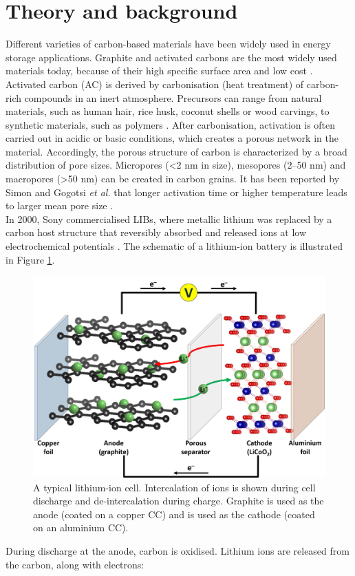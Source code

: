 \section{Theory and background}
Different varieties of carbon-based materials have been widely used in energy storage applications. Graphite and activated carbons are the most widely used materials today, because of their high specific surface area and low cost \cite{wang_review_2012}. Activated carbon (AC) is derived by carbonisation (heat treatment) of carbon-rich compounds in an inert atmosphere. Precursors can range from natural materials, such as human hair, rice husk, coconut shells or wood carvings, to synthetic materials, such as polymers \cite{hulicovajurcakova_combined_2009,si_tunable_2013,yalcin_studies_2000,barton_tailored_1999}. After carbonisation, activation is often carried out in acidic or basic conditions, which creates a porous network in the material. Accordingly, the porous structure of carbon is characterized by a broad distribution of pore sizes. Micropores (<2 nm in size), mesopores (2–50 nm) and macropores (>50 nm) can be created in carbon grains. It has been reported by Simon and Gogotsi \textit{et al.} that longer activation time or higher temperature leads to larger mean pore size \cite{simon_materials_2008}.\\
In 2000, Sony commercialised LIBs, where metallic lithium was replaced by a carbon host structure that reversibly absorbed and released  ions at low electrochemical potentials \cite{ozawa_lithium-ion_1994}. The schematic of a lithium-ion battery is illustrated in Figure \ref{Figures/chap5fig:LIB}.
\begin{figure}[h]
\centering
\includegraphics[width=\textwidth]{Figures/chap5fig/LIB}
\caption{A typical lithium-ion cell. Intercalation of  ions is shown during cell discharge and de-intercalation during charge. Graphite is used as the anode (coated on a copper CC) and  is used as the cathode (coated on an aluminium CC).}
 \label{Figures/chap5fig:LIB}
\end{figure}
During discharge at the anode, carbon is oxidised. Lithium ions are released from the carbon, along with electrons:

